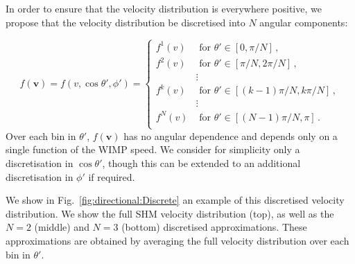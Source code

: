 In order to ensure that the velocity distribution is everywhere positive, we propose that the velocity distribution be discretised into $N$ angular components:

\begin{equation}
f(\textbf{v}) = f(v, \cos\theta', \phi') =
\begin{cases}
f^1(v) & \textrm{ for } \theta' \in \left[ 0, \pi/N\right]\,, \\
f^2(v) & \textrm{ for } \theta' \in \left[ \pi/N, 2\pi/N\right]\,, \\
 & \vdots\\
f^k(v) & \textrm{ for } \theta' \in \left[ (k-1)\pi/N, k\pi/N\right]\,, \\
 & \vdots\\
f^N(v) & \textrm{ for } \theta' \in \left[ (N-1)\pi/N, \pi\right]\,. \\
\end{cases}
\end{equation}
Over each bin in $\theta'$, $f(\textbf{v})$ has no angular dependence and depends only on a single function of the WIMP speed. We consider for simplicity only a discretisation in $\cos\theta'$, though this can be extended to an additional discretisation in $\phi'$ if required.


We show in Fig.~\ref{fig:directional:Discrete} an example of this discretised velocity distribution. We show the full SHM velocity distribution (top), as well as the $N=2$ (middle) and $N=3$ (bottom) discretised approximations. These approximations are obtained by averaging the full velocity distribution over each bin in $\theta'$.

